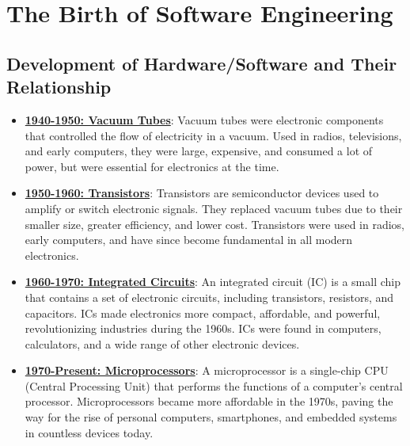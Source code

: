 \section{The Birth of Software Engineering}

\subsection{Development of Hardware/Software and Their Relationship}

\begin{itemize} \item \textbf{\underline{1940-1950: Vacuum Tubes}}:
Vacuum tubes were electronic components that controlled the flow of electricity in a vacuum. Used in radios, televisions, and early computers, they were large, expensive, and consumed a lot of power, but were essential for electronics at the time.



\item \textbf{\underline{1950-1960: Transistors}}:  
Transistors are semiconductor devices used to amplify or switch electronic signals. They replaced vacuum tubes due to their smaller size, greater efficiency, and lower cost. Transistors were used in radios, early computers, and have since become fundamental in all modern electronics.

\item \textbf{\underline{1960-1970: Integrated Circuits}}:  
An integrated circuit (IC) is a small chip that contains a set of electronic circuits, including transistors, resistors, and capacitors. ICs made electronics more compact, affordable, and powerful, revolutionizing industries during the 1960s. ICs were found in computers, calculators, and a wide range of other electronic devices.

\item \textbf{\underline{1970-Present: Microprocessors}}:  
A microprocessor is a single-chip CPU (Central Processing Unit) that performs the functions of a computer's central processor. Microprocessors became more affordable in the 1970s, paving the way for the rise of personal computers, smartphones, and embedded systems in countless devices today.

\end{itemize}

\vspace{0.5cm}


